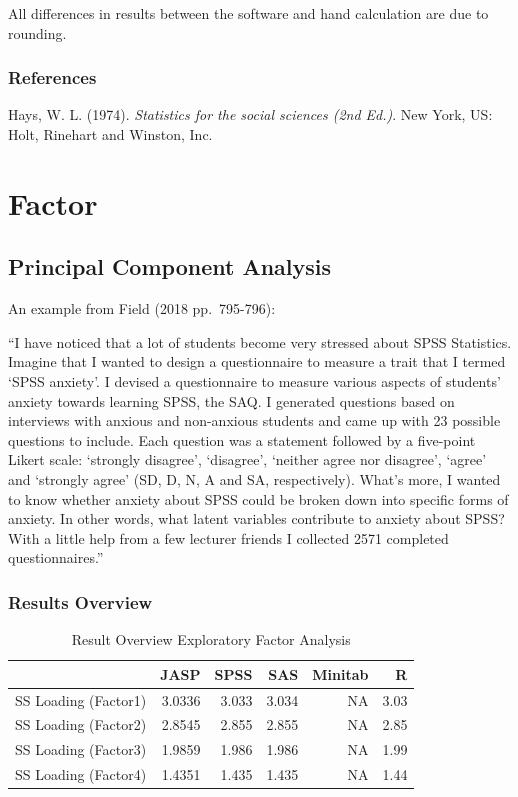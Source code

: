 \documentclass[
]{book}
\begin{document}
All differences in results between the software and hand calculation are due to rounding.

\hypertarget{references-1}{%
\subsection{References}\label{references-1}}

Hays, W. L. (1974). \emph{Statistics for the social sciences (2nd Ed.)}. New York, US: Holt, Rinehart and Winston, Inc.

\hypertarget{factor}{%
\chapter{Factor}\label{factor}}

\hypertarget{principal-component-analysis}{%
\section{Principal Component Analysis}\label{principal-component-analysis}}

An example from Field (2018 pp.~795-796):

``I have noticed that a lot of students become very stressed about SPSS Statistics. Imagine that I wanted to design a questionnaire to measure a trait that I termed `SPSS anxiety'. I devised a questionnaire to measure various aspects of students' anxiety towards learning SPSS, the SAQ. I generated questions based on interviews with anxious and non-anxious students and came up with 23 possible questions to include. Each question was a statement followed by a five-point Likert scale: `strongly disagree', `disagree', `neither agree nor disagree', `agree' and `strongly agree' (SD, D, N, A and SA, respectively). What's more, I wanted to know whether anxiety about SPSS could be broken down into specific forms of anxiety. In other words, what latent variables contribute to anxiety about SPSS? With a little help from a few lecturer friends I collected 2571 completed questionnaires.''

\hypertarget{results-overview}{%
\subsection{Results Overview}\label{results-overview}}

\begin{table}

\caption{\label{tab:unnamed-chunk-116}Result Overview Exploratory Factor Analysis}
\centering
\begin{tabular}[t]{lrrrrr}
\toprule
  & JASP & SPSS & SAS & Minitab & R\\
\midrule
SS Loading (Factor1) & 3.0336 & 3.033 & 3.034 & NA & 3.03\\
SS Loading (Factor2) & 2.8545 & 2.855 & 2.855 & NA & 2.85\\
SS Loading (Factor3) & 1.9859 & 1.986 & 1.986 & NA & 1.99\\
SS Loading (Factor4) & 1.4351 & 1.435 & 1.435 & NA & 1.44\\
\bottomrule
\end{tabular}
\end{table}
\end{document}
